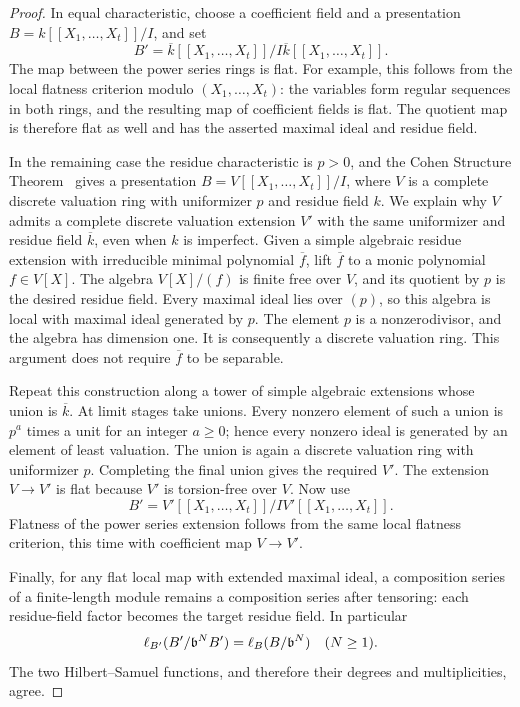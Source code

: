 \begin{proof}
In equal characteristic, choose a coefficient field and a presentation
$B=k[[X_1,\ldots,X_t]]/I$, and set
\[
  B'=\overline{k}[[X_1,\ldots,X_t]]/
             I\overline{k}[[X_1,\ldots,X_t]].
\]
The map between the power series rings is flat.  For example, this
follows from the local flatness criterion modulo $(X_1,\ldots,X_t)$:
the variables form regular sequences in both rings, and the resulting
map of coefficient fields is flat.  The quotient map is therefore flat
as well and has the asserted maximal ideal and residue field.

In the remaining case the residue characteristic is $p>0$, and the
Cohen Structure Theorem~\cite[Tag~032A]{Stacks} gives a presentation
$B=V[[X_1,\ldots,X_t]]/I$, where $V$ is a complete discrete
valuation ring with uniformizer $p$ and residue field $k$.  We explain
why $V$ admits a complete discrete valuation extension $V'$ with the
same uniformizer and residue field $\overline{k}$, even when $k$ is
imperfect.  Given a simple algebraic residue extension with irreducible
minimal polynomial $\overline f$, lift $\overline f$ to a monic
polynomial $f\in V[X]$.  The algebra $V[X]/(f)$ is finite free over $V$,
and its quotient by $p$ is the desired residue field.  Every maximal
ideal lies over $(p)$, so this algebra is local with maximal ideal
generated by $p$.  The element $p$ is a nonzerodivisor, and the algebra
has dimension one.  It is consequently a discrete valuation ring.
This argument does not require $\overline f$ to be separable.

Repeat this construction along a tower of simple algebraic extensions
whose union is $\overline{k}$.  At limit stages take unions.  Every
nonzero element of such a union is $p^a$ times a unit for an integer
$a\geq0$; hence every nonzero ideal is generated by an element of least
valuation.  The union is again a discrete valuation ring with
uniformizer $p$.  Completing the final union gives the required $V'$.
The extension $V\to V'$ is flat because $V'$ is torsion-free over $V$.
Now use
\[
  B'=V'[[X_1,\ldots,X_t]]/IV'[[X_1,\ldots,X_t]].
\]
Flatness of the power series extension follows from the same local
flatness criterion, this time with coefficient map $V\to V'$.

Finally, for any flat local map with extended maximal ideal, a
composition series of a finite-length module remains a composition
series after tensoring: each residue-field factor becomes the target
residue field.  In particular
\[
  \operatorname{\ell}_{B'}(B'/\mathfrak b^N B')
       =\operatorname{\ell}_B(B/\mathfrak b^N)\quad(N\geq1).
\]
The two Hilbert--Samuel functions, and therefore their degrees and
multiplicities, agree.
\end{proof}

